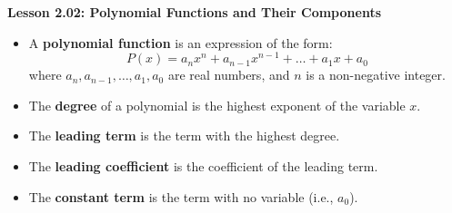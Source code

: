 \begin{center}
\textbf{Lesson 2.02: Polynomial Functions and Their Components}
\end{center}

\vspace*{-1.5ex}

\begin{itemize}
    \item A \textbf{polynomial function} is an expression of the form:
    \[
    P(x) = a_nx^n + a_{n-1}x^{n-1} + \dots + a_1x + a_0
    \]
    where \( a_n, a_{n-1}, \dots, a_1, a_0 \) are real numbers, and \( n \) is a non-negative integer.
    \item The \textbf{degree} of a polynomial is the highest exponent of the variable \( x \).
    \item The \textbf{leading term} is the term with the highest degree.
    \item The \textbf{leading coefficient} is the coefficient of the leading term.
    \item The \textbf{constant term} is the term with no variable (i.e., \( a_0 \)).
\end{itemize}
